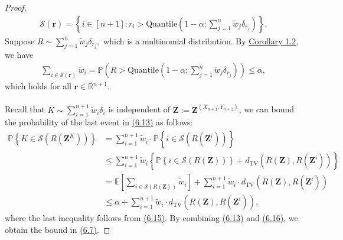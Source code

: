 \documentclass{article}
\numberwithin{equation}{section}
\newcommand{\E}{\mathbb{E}}
\begin{document}
\begin{proof}
\begin{align*}
	\mathcal{S}(\mathbf{r}) = \left\{i\in[n+1]:r_i > \mathrm{Quantile}\left(1-\alpha;\sum_{j=1}^n\widetilde{w}_j\delta_{r_j}\right)\right\}.\tag{6.14}
\end{align*}
Suppose $R\sim\sum_{j=1}^n\widetilde{w}_j\delta_{r_j},$ which is a multinomial distribution. By \hyperref[Corollary 1.2]{Corollary 1.2}, we have
\begin{align*}
	\sum_{i\in\mathcal{S}(\mathbf{r})}\widetilde{w}_i = \mathbb{P}\left(R > \mathrm{Quantile}\left(1-\alpha;\sum_{j=1}^n\widetilde{w}_j\delta_{r_j}\right)\right) \leq \alpha,\tag{6.15}\label{6.15}
\end{align*}
which holds for all $\mathbf{r}\in\mathbb{R}^{n+1}.$ 

\paragraph{} Recall that $K\sim\sum_{i=1}^{n+1}\widetilde{w}_i\delta_i$ is independent of $\mathbf{Z}:=\mathbf{Z}^{(X_{n+1},Y_{n+1})}$, we can bound the probability of the last event in \hyperref[6.13]{(6.13)} as follows:
\begin{align*}
	\mathbb{P}\left\{K\in\mathcal{S}\left(R(\mathbf{Z}^K)\right)\right\} &= \sum_{i=1}^{n+1}\widetilde{w}_i\cdot\mathbb{P}\left\{i\in\mathcal{S}\left(R(\mathbf{Z}^i)\right)\right\}\\
	&\leq \sum_{i=1}^{n+1}\widetilde{w}_i\left\{\mathbb{P}\left\{i\in\mathcal{S}\left(R(\mathbf{Z})\right)\right\} + d_\mathrm{TV}\left(R(\mathbf{Z}),R(\mathbf{Z}^i)\right)\right\}\\
	&= \E\left[\sum_{i\in\mathcal{S}\left(R(\mathbf{Z})\right)}\widetilde{w}_i\right] + \sum_{i=1}^{n+1}\widetilde{w}_i\cdot d_\mathrm{TV}\left(R(\mathbf{Z}),R(\mathbf{Z}^i)\right)\\
	&\leq \alpha + \sum_{i=1}^{n+1}\widetilde{w}_i\cdot d_\mathrm{TV}\left(R(\mathbf{Z}),R(\mathbf{Z}^i)\right), \tag{6.16}\label{6.16}
\end{align*}
where the last inequality follows from \hyperref[6.15]{(6.15)}. By combining \hyperref[6.13]{(6.13)} and \hyperref[6.16]{(6.16)}, we obtain the bound in \hyperref[6.7]{(6.7)}.
\end{proof}
\end{document}
